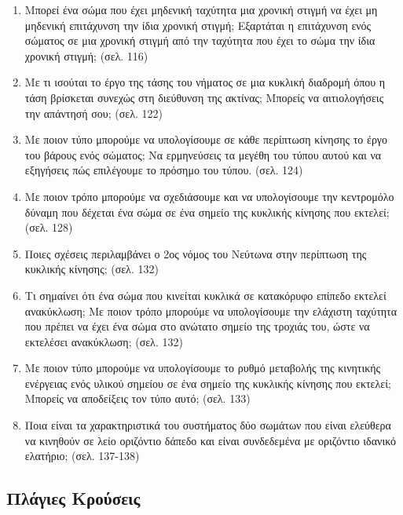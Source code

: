\documentclass{article}
\begin{document}
\begin{enumerate}
      \item
            Μπορεί ένα σώμα που έχει μηδενική ταχύτητα μια χρονική στιγμή να έχει μη μηδενική επιτάχυνση την ίδια χρονική στιγμή; Εξαρτάται η επιτάχυνση ενός σώματος σε μια χρονική στιγμή από την ταχύτητα που έχει το σώμα την ίδια χρονική στιγμή; (σελ. 116)

      \item
            Με τι ισούται το έργο της τάσης του νήματος σε μια κυκλική διαδρομή όπου η τάση βρίσκεται συνεχώς στη διεύθυνση της ακτίνας; Μπορείς να αιτιολογήσεις την απάντησή σου; (σελ. 122)

      \item
            Με ποιον τύπο μπορούμε να υπολογίσουμε σε κάθε περίπτωση κίνησης το έργο του βάρους ενός σώματος; Να ερμηνεύσεις τα μεγέθη του τύπου αυτού και να εξηγήσεις πώς επιλέγουμε το πρόσημο του τύπου. (σελ. 124)

      \item
            Με ποιον τρόπο μπορούμε να σχεδιάσουμε και να υπολογίσουμε την κεντρομόλο δύναμη που δέχεται ένα σώμα σε ένα σημείο της κυκλικής κίνησης που εκτελεί; (σελ. 128)

      \item
            Ποιες σχέσεις περιλαμβάνει ο 2ος νόμος του Νεύτωνα στην περίπτωση της κυκλικής κίνησης; (σελ. 132)

      \item
            Τι σημαίνει ότι ένα σώμα που κινείται κυκλικά σε κατακόρυφο επίπεδο εκτελεί ανακύκλωση; Με ποιον τρόπο μπορούμε να υπολογίσουμε την ελάχιστη ταχύτητα που πρέπει να έχει ένα σώμα στο ανώτατο σημείο της τροχιάς του, ώστε να εκτελέσει ανακύκλωση; (σελ. 132)

      \item
            Με ποιον τύπο μπορούμε να υπολογίσουμε το ρυθμό μεταβολής της κινητικής ενέργειας ενός υλικού σημείου σε ένα σημείο της κυκλικής κίνησης που εκτελεί; Μπορείς να αποδείξεις τον τύπο αυτό; (σελ. 133)

      \item
            Ποια είναι τα χαρακτηριστικά του συστήματος δύο σωμάτων που είναι ελεύθερα να κινηθούν σε λείο οριζόντιο δάπεδο και είναι συνδεδεμένα με οριζόντιο ιδανικό ελατήριο; (σελ. 137-138)
\end{enumerate}

\subsection{Πλάγιες Κρούσεις}
\end{document}
